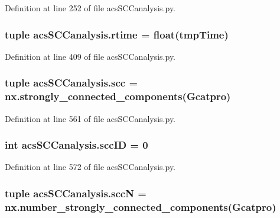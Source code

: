 Definition at line 252 of file acs\-S\-C\-Canalysis.\-py.

\hypertarget{a00102_a162a08b0497058c76e7e885c03a01336}{
\subsubsection[{rtime}]{\setlength{\rightskip}{0pt plus 5cm}tuple acs\-S\-C\-Canalysis.\-rtime = float(tmp\-Time)}}\label{a00102_a162a08b0497058c76e7e885c03a01336}


Definition at line 409 of file acs\-S\-C\-Canalysis.\-py.

\hypertarget{a00102_a2094b7f0917a16a948a2d1c4d700e84c}{
\subsubsection[{scc}]{\setlength{\rightskip}{0pt plus 5cm}tuple acs\-S\-C\-Canalysis.\-scc = nx.\-strongly\-\_\-connected\-\_\-components({\bf Gcatpro})}}\label{a00102_a2094b7f0917a16a948a2d1c4d700e84c}


Definition at line 561 of file acs\-S\-C\-Canalysis.\-py.

\hypertarget{a00102_a1dd3c43841ba4485a66889600f099a0c}{
\subsubsection[{scc\-I\-D}]{\setlength{\rightskip}{0pt plus 5cm}int acs\-S\-C\-Canalysis.\-scc\-I\-D = 0}}\label{a00102_a1dd3c43841ba4485a66889600f099a0c}


Definition at line 572 of file acs\-S\-C\-Canalysis.\-py.

\hypertarget{a00102_a185cbf8ef1ec67f52695562582418793}{
\subsubsection[{scc\-N}]{\setlength{\rightskip}{0pt plus 5cm}tuple acs\-S\-C\-Canalysis.\-scc\-N = nx.\-number\-\_\-strongly\-\_\-connected\-\_\-components({\bf Gcatpro})}}\label{a00102_a185cbf8ef1ec67f52695562582418793}


